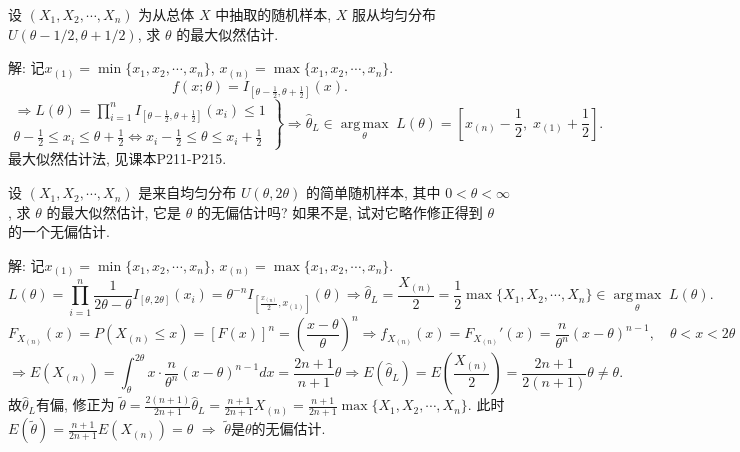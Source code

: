 \documentclass[standard]{ExBook}
\renewenvironment{shaded}{%
  \def\FrameCommand{\fboxsep=\FrameSep \colorbox{shadecolor}}%
  \MakeFramed{\advance\hsize-\width \FrameRestore}%
}{%
  \endMakeFramed
}
\begin{document}
\begin{qitems}
    \begin{bbox}
    \begin{shaded}
        \qitem
设 \((X_1, X_2, \cdots, X_n)\) 为从总体 \(X\) 中抽取的随机样本, \(X\) 服从均匀分布 \(U(\theta - 1/2, \theta + 1/2)\), 求 \(\theta\) 的最大似然估计.
    \end{shaded}
    \end{bbox}

\vspace{\dimexpr2.5cm-5em\relax}

解: 记$x_{(1)}=\min\{x_1,x_2,\cdots,x_n\}$, $x_{(n)}=\max\{x_1,x_2,\cdots,x_n\}$.
$$
f(x;\theta)=I_{\left[\theta-\frac12,\theta+\frac12\right]}(x).
$$
$$
\left.
\begin{array}{r}
\Longrightarrow
L(\theta)
=\displaystyle\prod_{i=1}^{n}I_{\left[\theta-\frac12,\theta+\frac12\right]}(x_i)
\leq 1\\
\theta-\frac12\leq x_i\leq \theta+\frac12
\Longleftrightarrow
x_i-\frac12\leq \theta\leq x_i+\frac12
\end{array}
\right\}
\Longrightarrow
\hat{\theta}_{L}
\in
\operatorname*{arg\,max}_{\theta}\;L(\theta)
=
\left[x_{(n)}-\frac12,\;x_{(1)}+\frac12\right].
$$
\textcolor{themeColor}{\selectfont {} 最大似然估计法, 见课本P211-P215.}

\vspace{2.5cm-5em}

    \begin{bbox}
    \begin{shaded}
        \qitem
设 \((X_1, X_2, \cdots, X_n)\) 是来自均匀分布 \(U(\theta, 2\theta)\) 的简单随机样本, 其中 \(0 < \theta < \infty\), 求 \(\theta\) 的最大似然估计, 它是 \(\theta\) 的无偏估计吗? 如果不是, 试对它略作修正得到 \(\theta\) 的一个无偏估计.
    \end{shaded}
    \end{bbox}

\vspace{\dimexpr2.5cm-5em\relax}

解: 记$x_{(1)}=\min\{x_1,x_2,\cdots,x_n\}$, $x_{(n)}=\max\{x_1,x_2,\cdots,x_n\}$.
$$
L(\theta)
=\prod_{i=1}^{n}\frac{1}{2\theta-\theta}I_{[\theta,2\theta]}(x_i)
=\theta^{-n}I_{\left[\frac{x_{(n)}}{2},x_{(1)}\right]}(\theta)
\Longrightarrow
\hat{\theta}_{L}
=\frac{X_{(n)}}{2}
=\frac{1}{2}\max\{X_1,X_2,\cdots,X_n\}
\in
\operatorname*{arg\,max}_{\theta}\;L(\theta).
$$
$$
F_{X_{(n)}}(x)
=P(X_{(n)}\leq x)
=[F(x)]^n
=\left(\frac{x-\theta}{\theta}\right)^n
\Longrightarrow
f_{X_{(n)}}(x)
=F_{X_{(n)}}'(x)
=\frac{n}{\theta^n}(x-\theta)^{n-1},\quad \theta<x<2\theta
$$
$$
\Longrightarrow
E(X_{(n)})
=\int_{\theta}^{2\theta}x\cdot\frac{n}{\theta^n}(x-\theta)^{n-1}dx
=\frac{2n+1}{n+1}\theta
\Longrightarrow
E(\hat{\theta}_{L})
=E\left(\frac{X_{(n)}}{2}\right)
=\frac{2n+1}{2(n+1)}\theta
\neq\theta.
$$
故$\hat{\theta}_{L}$有偏, 修正为
$
\tilde{\theta}
=
\frac{2(n+1)}{2n+1}\hat{\theta}_{L}
=
\frac{n+1}{2n+1}X_{(n)}
=
\frac{n+1}{2n+1}\max\{X_1,X_2,\cdots,X_n\}
$.
此时
$
E(\tilde{\theta})
=\frac{n+1}{2n+1}E(X_{(n)})
=\theta
$
$\Longrightarrow$
$\tilde{\theta}$是$\theta$的无偏估计.


\end{qitems}
\end{document}
